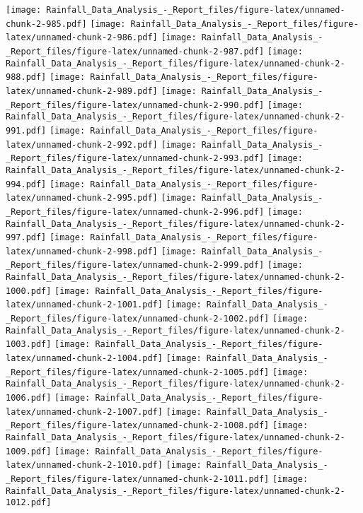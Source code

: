 \documentclass[
]{article}
\begin{document}
\texttt{[image: Rainfall\_Data\_Analysis\_-\_Report\_files/figure-latex/unnamed-chunk-2-985.pdf]}
\texttt{[image: Rainfall\_Data\_Analysis\_-\_Report\_files/figure-latex/unnamed-chunk-2-986.pdf]}
\texttt{[image: Rainfall\_Data\_Analysis\_-\_Report\_files/figure-latex/unnamed-chunk-2-987.pdf]}
\texttt{[image: Rainfall\_Data\_Analysis\_-\_Report\_files/figure-latex/unnamed-chunk-2-988.pdf]}
\texttt{[image: Rainfall\_Data\_Analysis\_-\_Report\_files/figure-latex/unnamed-chunk-2-989.pdf]}
\texttt{[image: Rainfall\_Data\_Analysis\_-\_Report\_files/figure-latex/unnamed-chunk-2-990.pdf]}
\texttt{[image: Rainfall\_Data\_Analysis\_-\_Report\_files/figure-latex/unnamed-chunk-2-991.pdf]}
\texttt{[image: Rainfall\_Data\_Analysis\_-\_Report\_files/figure-latex/unnamed-chunk-2-992.pdf]}
\texttt{[image: Rainfall\_Data\_Analysis\_-\_Report\_files/figure-latex/unnamed-chunk-2-993.pdf]}
\texttt{[image: Rainfall\_Data\_Analysis\_-\_Report\_files/figure-latex/unnamed-chunk-2-994.pdf]}
\texttt{[image: Rainfall\_Data\_Analysis\_-\_Report\_files/figure-latex/unnamed-chunk-2-995.pdf]}
\texttt{[image: Rainfall\_Data\_Analysis\_-\_Report\_files/figure-latex/unnamed-chunk-2-996.pdf]}
\texttt{[image: Rainfall\_Data\_Analysis\_-\_Report\_files/figure-latex/unnamed-chunk-2-997.pdf]}
\texttt{[image: Rainfall\_Data\_Analysis\_-\_Report\_files/figure-latex/unnamed-chunk-2-998.pdf]}
\texttt{[image: Rainfall\_Data\_Analysis\_-\_Report\_files/figure-latex/unnamed-chunk-2-999.pdf]}
\texttt{[image: Rainfall\_Data\_Analysis\_-\_Report\_files/figure-latex/unnamed-chunk-2-1000.pdf]}
\texttt{[image: Rainfall\_Data\_Analysis\_-\_Report\_files/figure-latex/unnamed-chunk-2-1001.pdf]}
\texttt{[image: Rainfall\_Data\_Analysis\_-\_Report\_files/figure-latex/unnamed-chunk-2-1002.pdf]}
\texttt{[image: Rainfall\_Data\_Analysis\_-\_Report\_files/figure-latex/unnamed-chunk-2-1003.pdf]}
\texttt{[image: Rainfall\_Data\_Analysis\_-\_Report\_files/figure-latex/unnamed-chunk-2-1004.pdf]}
\texttt{[image: Rainfall\_Data\_Analysis\_-\_Report\_files/figure-latex/unnamed-chunk-2-1005.pdf]}
\texttt{[image: Rainfall\_Data\_Analysis\_-\_Report\_files/figure-latex/unnamed-chunk-2-1006.pdf]}
\texttt{[image: Rainfall\_Data\_Analysis\_-\_Report\_files/figure-latex/unnamed-chunk-2-1007.pdf]}
\texttt{[image: Rainfall\_Data\_Analysis\_-\_Report\_files/figure-latex/unnamed-chunk-2-1008.pdf]}
\texttt{[image: Rainfall\_Data\_Analysis\_-\_Report\_files/figure-latex/unnamed-chunk-2-1009.pdf]}
\texttt{[image: Rainfall\_Data\_Analysis\_-\_Report\_files/figure-latex/unnamed-chunk-2-1010.pdf]}
\texttt{[image: Rainfall\_Data\_Analysis\_-\_Report\_files/figure-latex/unnamed-chunk-2-1011.pdf]}
\texttt{[image: Rainfall\_Data\_Analysis\_-\_Report\_files/figure-latex/unnamed-chunk-2-1012.pdf]}
\end{document}

